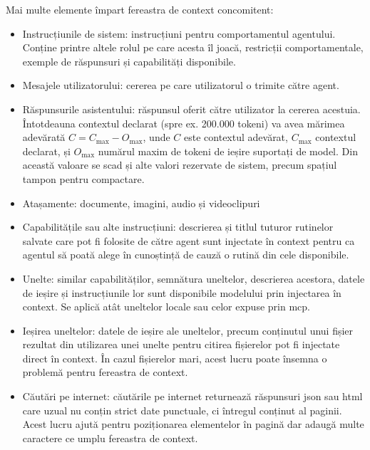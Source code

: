 \documentclass[12pt, a4paper, oneside, romanian]{teza-upb}
\begin{document}
    \newpage

    Mai multe elemente împart fereastra de context concomitent: 

    \begin{itemize}
      \item Instrucțiunile de sistem: instrucțiuni pentru comportamentul agentului. Conține printre altele rolul pe care acesta îl joacă,
      restricții comportamentale, exemple de răspunsuri și capabilități disponibile.
      \item Mesajele utilizatorului: cererea pe care utilizatorul o trimite către agent.
      \item Răspunsurile asistentului: răspunsul oferit către utilizator la cererea acestuia. Întotdeauna contextul declarat (spre ex. 200.000 tokeni) va avea mărimea adevărată $C = C_{\max} - O_{\max}$, unde $C$ este contextul adevărat, $C_{\max}$ contextul declarat, și $O_{\max}$ numărul maxim de tokeni de ieșire suportați de model. Din această valoare se scad și alte valori rezervate de sistem, precum spațiul tampon pentru compactare.
      \item Atașamente: documente, imagini, audio și videoclipuri
      \item Capabilitățile sau alte instrucțiuni: descrierea și titlul tuturor rutinelor salvate care pot fi
      folosite de către agent sunt injectate în context pentru ca agentul să poată alege în cunoștință de cauză o rutină din cele disponibile.
      \item Unelte: similar capabilităților, semnătura uneltelor, descrierea acestora, datele de ieșire și \newline instrucțiunile lor sunt disponibile modelului prin injectarea
      în context. Se aplică atât uneltelor locale sau celor expuse prin \ac{mcp}.
      \item Ieșirea uneltelor: datele de ieșire ale uneltelor, precum conținutul unui fișier rezultat din utilizarea unei unelte pentru citirea fișierelor pot fi injectate direct în context.
      În cazul fișierelor mari, acest lucru poate însemna o problemă pentru fereastra de context.
      \item Căutări pe internet: căutările pe internet returnează răspunsuri \ac{json} sau \ac{html} care uzual nu conțin strict date punctuale, ci întregul conținut al paginii. Acest lucru ajută pentru poziționarea
      elementelor în pagină dar adaugă multe caractere ce umplu fereastra de context.
    \end{itemize}
    
\end{document}
